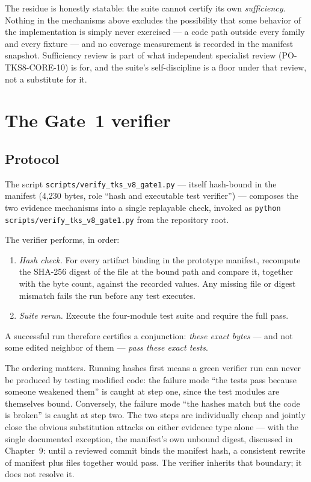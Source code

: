 The residue is honestly statable: the suite cannot certify its own
\emph{sufficiency}. Nothing in the mechanisms above excludes the
possibility that some behavior of the implementation is simply never
exercised --- a code path outside every family and every fixture ---
and no coverage measurement is recorded in the manifest snapshot.
Sufficiency review is part of what independent specialist review
(PO-TKS8-CORE-10) is for, and the suite's self-discipline is a floor
under that review, not a substitute for it.

\section{The Gate~1 verifier}\label{ch10:sec:gate1}

\subsection{Protocol}

The script \texttt{scripts/verify\_tks\_v8\_gate1.py} --- itself
hash-bound in the manifest (4{,}230 bytes, role ``hash and executable test
verifier'') --- composes the two evidence mechanisms into a single
replayable check, invoked as
\texttt{python scripts/verify\_tks\_v8\_gate1.py} from the repository
root.

\begin{protocol}\label{ch10:proto:gate1}
The verifier performs, in order:
\begin{enumerate}
\item \emph{Hash check.} For every artifact binding in the prototype
      manifest, recompute the SHA-256 digest of the file at the bound path
      and compare it, together with the byte count, against the recorded
      values. Any missing file or digest mismatch fails the run before
      any test executes.
\item \emph{Suite rerun.} Execute the four-module test suite and require
      the full pass.
\end{enumerate}
A successful run therefore certifies a conjunction: \emph{these exact
bytes} --- and not some edited neighbor of them --- \emph{pass these
exact tests}.
\end{protocol}

The ordering matters. Running hashes first means a green verifier run can
never be produced by testing modified code: the failure mode ``the tests
pass because someone weakened them'' is caught at step one, since the test
modules are themselves bound. Conversely, the failure mode ``the hashes
match but the code is broken'' is caught at step two. The two steps are
individually cheap and jointly close the obvious substitution attacks on
either evidence type alone --- with the single documented exception, the
manifest's own unbound digest, discussed in Chapter~9: until a reviewed
commit binds the manifest hash, a consistent rewrite of manifest plus
files together would pass. The verifier inherits that boundary; it does
not resolve it.


